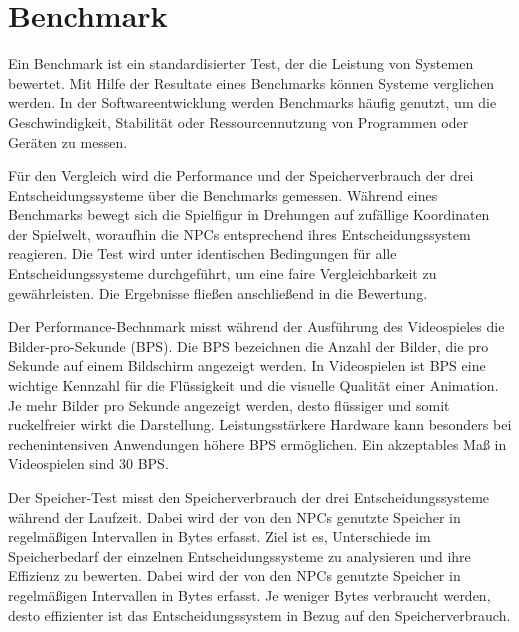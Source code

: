 \section{Benchmark}
\label{chap:benchmark}

Ein Benchmark ist ein standardisierter Test, der die Leistung von Systemen bewertet. Mit Hilfe der Resultate eines Benchmarks k\"{o}nnen Systeme verglichen werden. In der Softwareentwicklung werden Benchmarks h\"{a}ufig genutzt, um die Geschwindigkeit, Stabilit\"{a}t oder Ressourcennutzung von Programmen oder Ger\"{a}ten zu messen.

F\"{u}r den Vergleich wird die Performance und der Speicherverbrauch der drei Entscheidungssysteme \"{u}ber die Benchmarks gemessen. W\"{a}hrend eines Benchmarks bewegt sich die Spielfigur in Drehungen auf zuf\"{a}llige Koordinaten der Spielwelt, woraufhin die NPCs entsprechend ihres Entscheidungssystem reagieren. Die Test wird unter identischen Bedingungen f\"{u}r alle Entscheidungssysteme durchgef\"{u}hrt, um eine faire Vergleichbarkeit zu gew\"{a}hrleisten. Die Ergebnisse flie\ss{}en anschlie\ss{}end in die Bewertung.

Der Performance-Bechnmark misst w\"{a}hrend der Ausf\"{u}hrung des Videospieles die Bilder-pro-Sekunde (BPS). Die BPS bezeichnen die Anzahl der Bilder, die pro Sekunde auf einem Bildschirm angezeigt werden. In Videospielen ist BPS eine wichtige Kennzahl f\"{u}r die Fl\"{u}ssigkeit und die visuelle Qualit\"{a}t einer Animation. Je mehr Bilder pro Sekunde angezeigt werden, desto fl\"{u}ssiger und somit ruckelfreier wirkt die Darstellung. Leistungsst\"{a}rkere Hardware kann besonders bei rechenintensiven Anwendungen h\"{o}here BPS erm\"{o}glichen. Ein akzeptables Ma\ss{} in Videospielen sind 30 BPS.

Der Speicher-Test misst den Speicherverbrauch der drei Entscheidungssysteme w\"{a}hrend der Laufzeit. Dabei wird der von den NPCs genutzte Speicher in regelm\"{a}\ss{}igen Intervallen in Bytes erfasst. Ziel ist es, Unterschiede im Speicherbedarf der einzelnen Entscheidungssysteme zu analysieren und ihre Effizienz zu bewerten. Dabei wird der von den NPCs genutzte Speicher in regelm\"{a}\ss{}igen Intervallen in Bytes erfasst. Je weniger Bytes verbraucht werden, desto effizienter ist das Entscheidungssystem in Bezug auf den Speicherverbrauch.